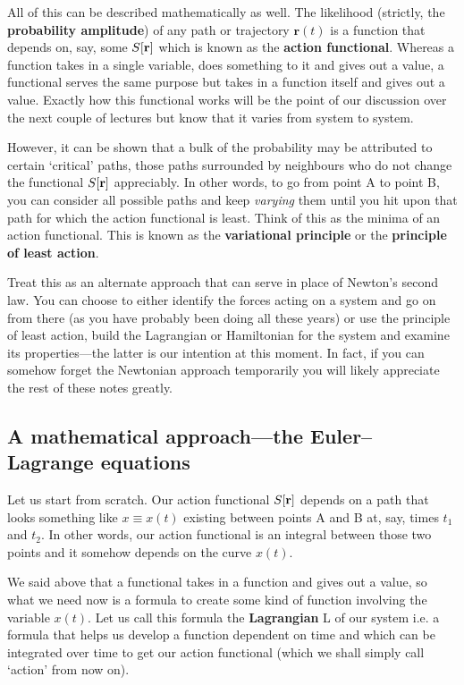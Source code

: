 \documentclass[english,seminar,headertitle]{lecture}
\begin{document}
All of this can be described mathematically as well. The likelihood (strictly, the \textbf{probability amplitude}) of any path or trajectory $\mathbf{r}(t)$ is a function that depends on, say, some $S[\mathbf{r}]$ which is known as the \textbf{action functional}. Whereas a function takes in a single variable, does something to it and gives out a value, a functional serves the same purpose but takes in a function itself and gives out a value. Exactly how this functional works will be the point of our discussion over the next couple of lectures but know that it varies from system to system.

However, it can be shown that a bulk of the probability may be attributed to certain `critical' paths, those paths surrounded by neighbours who do not change the functional $S[\mathbf{r}]$ appreciably. In other words, to go from point A to point B, you can consider all possible paths and keep \textit{varying} them until you hit upon that path for which the action functional is least. Think of this as the minima of an action functional. This is known as the \textbf{variational principle} or the \textbf{principle of least action}.

Treat this as an alternate approach that can serve in place of Newton's second law. You can choose to either identify the forces acting on a system and go on from there (as you have probably been doing all these years) or use the principle of least action, build the Lagrangian or Hamiltonian for the system and examine its properties---the latter is our intention at this moment. In fact, if you can somehow forget the Newtonian approach temporarily you will likely appreciate the rest of these notes greatly.
%
\subsection{A mathematical approach---the Euler--Lagrange equations}
%
Let us start from scratch. Our action functional $S[\mathbf{r}]$ depends on a path that looks something like $x \equiv x(t)$ existing between points A and B at, say, times $t_1$ and $t_2$. In other words, our action functional is an integral between those two points and it somehow depends on the curve $x(t)$.

We said above that a functional takes in a function and gives out a value, so what we need now is a formula to create some kind of function involving the variable $x(t)$. Let us call this formula the \textbf{Lagrangian} L of our system i.e. a formula that helps us develop a function dependent on time and which can be integrated over time to get our action functional (which we shall simply call `action' from now on).
\end{document}
